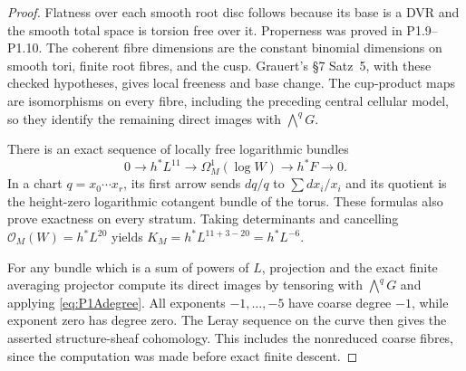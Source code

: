 \begin{proof}
Flatness over each smooth root disc follows because its base is a
DVR and the smooth total space is torsion free over it. Properness
was proved in P1.9--P1.10. The coherent fibre dimensions are the
constant binomial dimensions on smooth tori, finite root fibres,
and the cusp. Grauert's \S7 Satz~5, with these checked hypotheses,
gives local freeness and base change. The cup-product maps are
isomorphisms on every fibre, including the preceding central
cellular model, so they identify the remaining direct images with
$\bigwedge^qG$.

There is an exact sequence of locally free logarithmic bundles
\begin{equation}\label{eq:P1Alogcotangent}
0\longrightarrow h^*L^{11}\longrightarrow\Omega_M^1(\log W)
 \longrightarrow h^*F\longrightarrow0.
\end{equation}
In a chart $q=x_0\cdots x_r$, its first arrow sends
$dq/q$ to $\sum dx_i/x_i$ and its quotient is the height-zero
logarithmic cotangent bundle of the torus. These formulas also
prove exactness on every stratum. Taking determinants and
cancelling $\mathcal O_M(W)=h^*L^{20}$ yields
$K_M=h^*L^{11+3-20}=h^*L^{-6}$.

For any bundle which is a sum of powers of $L$, projection and
the exact finite averaging projector compute its direct images
by tensoring with $\bigwedge^qG$ and applying
\eqref{eq:P1Adegree}. All exponents $-1,\ldots,-5$ have coarse
degree $-1$, while exponent zero has degree zero. The Leray
sequence on the curve then gives the asserted structure-sheaf
cohomology. This includes the nonreduced coarse fibres, since
the computation was made before exact finite descent.
\end{proof}

